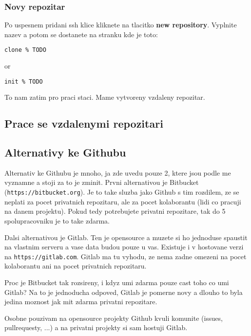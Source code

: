 \documentclass[12pt,a5paper]{article}
\begin{document}
\subsubsection{Novy repozitar}

Po uspesnem pridani ssh klice kliknete na tlacitko {\bf new repository}. Vyplnite nazev a potom se dostanete na stranku kde je toto:


\begin{lstlisting}
clone % TODO
\end{lstlisting}

or

\begin{lstlisting}
init % TODO
\end{lstlisting}

To nam zatim pro praci staci. Mame vytvoreny vzdaleny repozitar.

\subsection{Prace se vzdalenymi repozitari}

\subsection{Alternativy ke Githubu}

Alternativ ke Githubu je mnoho, ja zde uvedu pouze 2, ktere jsou podle me vyznamne a stoji za to je zminit. Prvni alternativou je Bitbucket (\lstinline|https://bitbucket.org|). Je to take sluzba jako Github s tim rozdilem, ze se neplati za pocet privatnich repozitaru, ale za pocet kolaborantu (lidi co pracuji na danem projektu). Pokud tedy potrebujete privatni repozitare, tak do 5 spolupracovniku je to take zdarma.

Dalsi alternativou je Gitlab. Ten je opensource a muzete si ho jednoduse spaustit na vlastnim serveru a vase data budou pouze u vas. Existuje i v hostovane verzi na \lstinline|https://gitlab.com|. Gitlab ma tu vyhodu, ze nema zadne omezeni na pocet kolaborantu ani na pocet privatnich repozitaru.

Proc je Bitbucket tak rozsireny, i kdyz umi zdarma pouze cast toho co umi Gitlab? Na to je jednoducha odpoved, Gitlab je pomerne novy a dlouho to byla jedina moznost jak mit zdarma privatni repozitare.

Osobne pouzivam na opensource projekty Github kvuli komunite (issues, pullrequesty, ...) a na privatni projekty si sam hostuji Gitlab.
\end{document}
